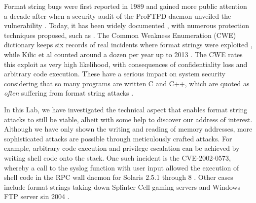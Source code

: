 
Format string bugs were first reported in 1989 \cite{Miller1990} and gained more public attention a decade after when a security audit of the ProFTPD daemon unveiled the vulnerability \cite{tymm1999}. Today, it has been widely documented \cite{fsa_owasp, Weitz2014, arbaugh1997automated, scut2001}, with numerous protection techniques proposed, such as \cite{Shankar2001, cowan2002}. The Common Weakness Enumeration (CWE) dictionary keeps six records of real incidents where format strings were exploited \cite{fsa_cwe}, while Kilic et al counted around a dozen per year up to 2013 \cite{Kilic2015}. The CWE rates this exploit as very high likelihood, with  consequences of confidentiality loss and arbitrary code execution. These have a serious impact on system security considering that so many programs are written C and C++, which are quoted as \emph{often} suffering from format string attacks \cite{fsa_cwe}.

In this Lab, we have investigated the technical aspect that enables format string attacks to still be viable, albeit with some help to discover our address of interest. Although we have only shown the writing and reading of memory addresses, more sophisticated attacks are possible through meticulously crafted attacks. For example, arbitrary code execution and privilege escalation can be achieved by writing shell code onto the stack. One such incident is the CVE-2002-0573, whereby a call to the syslog function with user input allowed the execution of shell code in the RPC wall daemon for Solaris 2.5.1 through 8 \cite{cve-solaris2002}. Other cases include format strings taking down Splinter Cell gaming servers \cite{Auriemma} and Windows FTP server sin 2004 \cite{Winter-Smith2004}.

